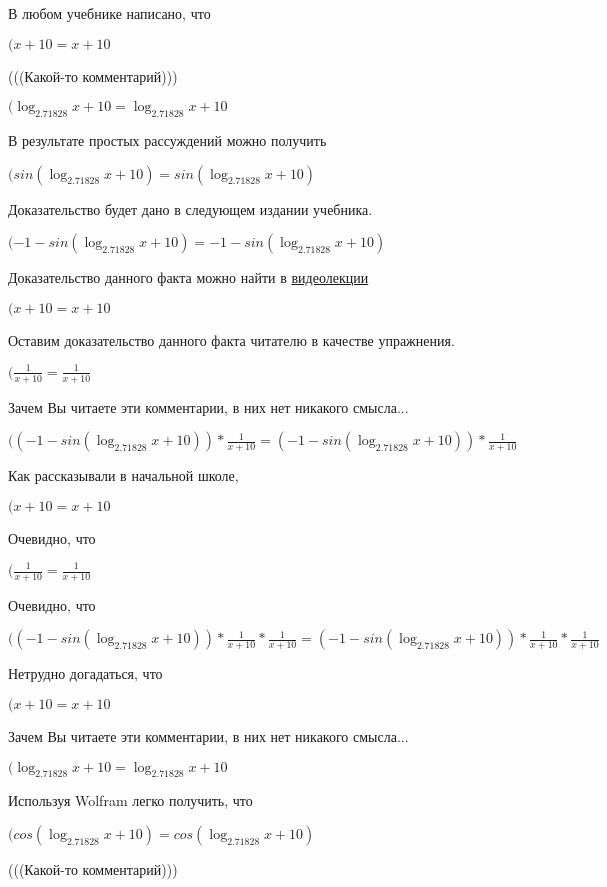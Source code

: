 \documentclass[12pt,a4paper,fleqn]{article}
\theoremstyle{definition}
\begin{document}
В любом учебнике написано, что

$( x  +  10  =  x  +  10 $

(((Какой-то комментарий)))

$(\log_{ 2.71828 }{ x  +  10 } = \log_{ 2.71828 }{ x  +  10 }$

В результате простых рассуждений можно получить

$(sin(\log_{ 2.71828 }{ x  +  10 }) = sin(\log_{ 2.71828 }{ x  +  10 })$

Доказательство будет дано в следующем издании учебника.

$( -1  - sin(\log_{ 2.71828 }{ x  +  10 }) =  -1  - sin(\log_{ 2.71828 }{ x  +  10 })$

Доказательство данного факта можно найти в \href{https://www.youtube.com/watch?v=dQw4w9WgXcQ}{видеолекции}

$( x  +  10  =  x  +  10 $

Оставим доказательство данного факта читателю в качестве упражнения.

$(\frac{ 1 }{ x  +  10 }
 = \frac{ 1 }{ x  +  10 }
$

Зачем Вы читаете эти комментарии, в них нет никакого смысла...

$(( -1  - sin(\log_{ 2.71828 }{ x  +  10 })) * \frac{ 1 }{ x  +  10 }
 = ( -1  - sin(\log_{ 2.71828 }{ x  +  10 })) * \frac{ 1 }{ x  +  10 }
$

Как рассказывали в начальной школе,

$( x  +  10  =  x  +  10 $

Очевидно, что

$(\frac{ 1 }{ x  +  10 }
 = \frac{ 1 }{ x  +  10 }
$

Очевидно, что

$(( -1  - sin(\log_{ 2.71828 }{ x  +  10 })) * \frac{ 1 }{ x  +  10 }
 * \frac{ 1 }{ x  +  10 }
 = ( -1  - sin(\log_{ 2.71828 }{ x  +  10 })) * \frac{ 1 }{ x  +  10 }
 * \frac{ 1 }{ x  +  10 }
$

Нетрудно догадаться, что

$( x  +  10  =  x  +  10 $

Зачем Вы читаете эти комментарии, в них нет никакого смысла...

$(\log_{ 2.71828 }{ x  +  10 } = \log_{ 2.71828 }{ x  +  10 }$

Используя Wolfram легко получить, что

$(cos(\log_{ 2.71828 }{ x  +  10 }) = cos(\log_{ 2.71828 }{ x  +  10 })$

(((Какой-то комментарий)))
\end{document}
